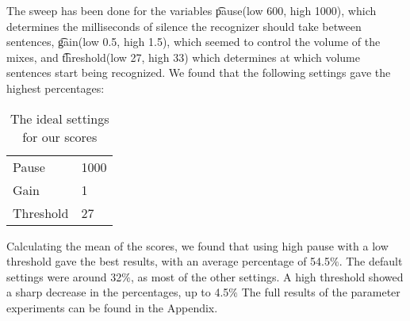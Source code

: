 
The sweep has been done for the variables \t{pause}(low 600, high 1000), which determines the milliseconds of silence the recognizer should take between sentences, \t{gain}(low 0.5, high 1.5), which seemed to control the volume of the mixes, and \t{threshold}(low 27, high 33) which determines at which volume sentences start being recognized. We found that the following settings gave the highest percentages:

\begin{table}[]
\centering
\caption{The ideal settings for our scores}
\label{my-label}
\begin{tabular}{l|l}
Pause     & 1000 \\
Gain      & 1    \\
Threshold & 27  
\end{tabular}
\end{table}

Calculating the mean of the scores, we found that using high pause with a low threshold gave the best results, with an average percentage of 54.5$\%$. The default settings were around 32$\%$, as most of the other settings. A high threshold showed a sharp decrease in the percentages, up to 4.5$\%$ The full results of the parameter experiments can be found in the Appendix.

